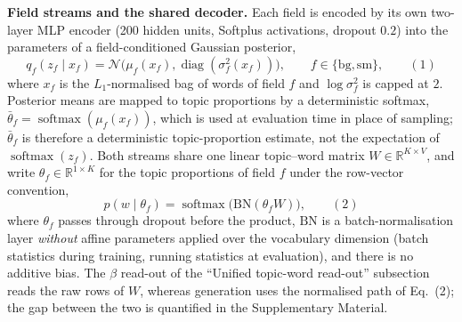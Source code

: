 \documentclass[Journal,letterpaper,NoLists]{ascelike-new}
\begin{document}
\noindent\textbf{Field streams and the shared decoder.} Each field is encoded by its own two-layer MLP encoder (200 hidden units, Softplus activations,
dropout $0.2$) into the parameters of a field-conditioned Gaussian posterior,
\begin{equation}
q_f(z_f\mid x_f)=\mathcal N\big(\mu_f(x_f),\operatorname{diag}(\sigma_f^2(x_f))\big),
\qquad f\in\{\mathrm{bg},\mathrm{sm}\},
\qquad(1)\end{equation}
where $x_f$ is the $L_1$-normalised bag of words of field $f$ and $\log\sigma_f^2$ is capped at
$2$. Posterior means are mapped to topic proportions by a deterministic softmax,
$\bar\theta_f=\operatorname{softmax}(\mu_f(x_f))$, which is used at evaluation time in place of
sampling; $\bar\theta_f$ is therefore a deterministic topic-proportion estimate, not the
expectation of $\operatorname{softmax}(z_f)$. Both streams share one linear topic--word matrix
$W\in\mathbb{R}^{K\times V}$, and write $\theta_f\in\mathbb{R}^{1\times K}$ for the topic
proportions of field $f$ under the row-vector convention,
\begin{equation}
p(w\mid\theta_f)=\operatorname{softmax}\!\big(\mathrm{BN}(\theta_f W)\big),
\label{eq:decode}
\qquad(2)\end{equation}
where $\theta_f$ passes through dropout before the product, $\mathrm{BN}$ is a batch-normalisation
layer \emph{without} affine parameters applied over the vocabulary dimension (batch statistics
during training, running statistics at evaluation), and there is no additive bias. The $\beta$
read-out of the ``Unified topic-word read-out'' subsection reads the raw rows of $W$, whereas generation uses the
normalised path of Eq.~(2); the gap between the two is quantified in the
Supplementary Material.
\end{document}
